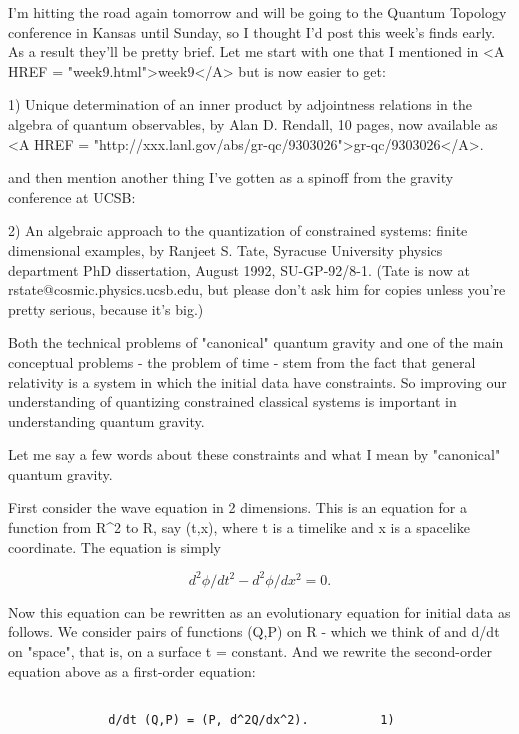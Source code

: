

I'm hitting the road again tomorrow and will be going to the Quantum
Topology conference in Kansas until Sunday, so I thought I'd post this
week's finds early.  As a result they'll be pretty brief.  Let me start
with one that I mentioned in <A HREF = "week9.html">week9</A> but is now easier to get:

1)  Unique determination of an inner product by adjointness relations
in the algebra of quantum observables, by Alan D. Rendall, 10 pages, now
available as <A HREF = "http://xxx.lanl.gov/abs/gr-qc/9303026">gr-qc/9303026</A>.

and then mention another thing I've gotten as a spinoff from the
gravity conference at UCSB:

2)  An algebraic approach to the quantization of constrained systems:
finite dimensional examples, by Ranjeet S. Tate, Syracuse University
physics department PhD dissertation, August 1992, SU-GP-92/8-1.  (Tate
is now at rstate@cosmic.physics.ucsb.edu, but please don't ask him for
copies unless you're pretty serious, because it's big.)

Both the technical problems of "canonical" quantum gravity and one of the
main conceptual problems - the problem of time - stem from the fact that
general relativity is a system in which the initial data have
constraints.  So improving our understanding of quantizing constrained
classical systems is important in understanding quantum gravity.

Let me say a few words about these constraints and what I mean by
"canonical" quantum gravity.  

First consider the wave equation in 2 dimensions.  This is
an equation for a function from R^2 to R, say \phi (t,x), where t is a
timelike and x is a spacelike coordinate.  The equation is simply


$$

		d^2 \phi /dt^2 - d^2\phi /dx^2 = 0.
$$
    
Now this equation can be rewritten as an evolutionary equation for
initial data as follows.  We consider pairs of functions (Q,P) on R -
which we think of \phi  and d\phi /dt on "space", that is, on a surface t =
constant.  And we rewrite the second-order equation above as a
first-order equation:


\begin{verbatim}

              d/dt (Q,P) = (P, d^2Q/dx^2).			1)
\end{verbatim}
    
